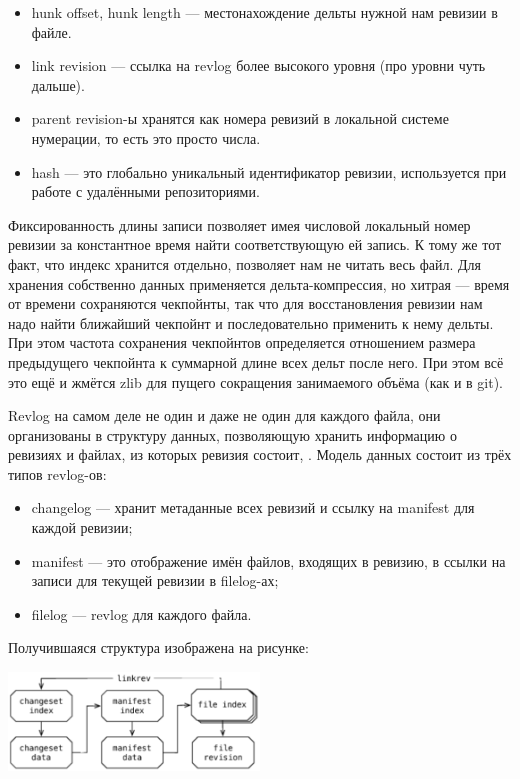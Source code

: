 \documentclass{../../text-style}
\begin{document}
\begin{itemize}
    \item hunk offset, hunk length --- местонахождение дельты нужной нам ревизии в файле. 
    \item link revision --- ссылка на revlog более высокого уровня (про уровни чуть дальше).
    \item parent revision-ы хранятся как номера ревизий в локальной системе нумерации, то есть это просто числа.
    \item hash --- это глобально уникальный идентификатор ревизии, используется при работе с удалёнными репозиториями.
\end{itemize}

Фиксированность длины записи позволяет имея числовой локальный номер ревизии за константное время найти соответствующую ей запись. К тому же тот факт, что индекс хранится отдельно, позволяет нам не читать весь файл. Для хранения собственно данных применяется дельта-компрессия, но хитрая --- время от времени сохраняются чекпойнты, так что для восстановления ревизии нам надо найти ближайший чекпойнт и последовательно применить к нему дельты. При этом частота сохранения чекпойнтов определяется отношением размера предыдущего чекпойнта к суммарной длине всех дельт после него. При этом всё это ещё и жмётся zlib для пущего сокращения занимаемого объёма (как и в git).

Revlog на самом деле не один и даже не один для каждого файла, они организованы в структуру данных, позволяющую хранить информацию о ревизиях и файлах, из которых ревизия состоит, . Модель данных состоит из трёх типов revlog-ов:

\begin{itemize}
    \item changelog --- хранит метаданные всех ревизий и ссылку на manifest для каждой ревизии;
    \item manifest --- это отображение имён файлов, входящих в ревизию, в ссылки на записи для текущей ревизии в filelog-ах;
    \item filelog --- revlog для каждого файла.
\end{itemize}

Получившаяся структура изображена на рисунке:

\begin{center}
    \includegraphics[width=0.5\textwidth]{mercurialLogStructure.png}
\end{center}
\end{document}
